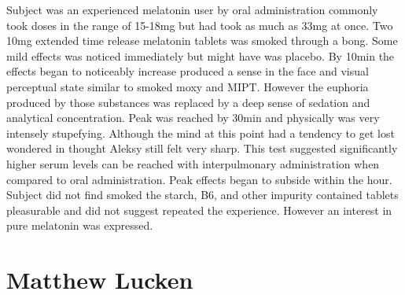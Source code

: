\documentclass[12pt]{book}
\begin{document}
Subject was an experienced melatonin user by oral administration commonly took doses in the range of 15-18mg but had took as much as 33mg at once. Two 10mg extended time release melatonin tablets was smoked through a bong. Some mild effects was noticed immediately but might have was placebo. By 10min the effects began to noticeably increase produced a sense in the face and visual perceptual state similar to smoked moxy and MIPT. However the euphoria produced by those substances was replaced by a deep sense of sedation and analytical concentration. Peak was reached by 30min and physically was very intensely stupefying. Although the mind at this point had a tendency to get lost wondered in thought Aleksy still felt very sharp. This test suggested significantly higher serum levels can be reached with interpulmonary administration when compared to oral administration. Peak effects began to subside within the hour. Subject did not find smoked the starch, B6, and other impurity contained tablets pleasurable and did not suggest repeated the experience. However an interest in pure melatonin was expressed.



\chapter{Matthew Lucken}
\end{document}
